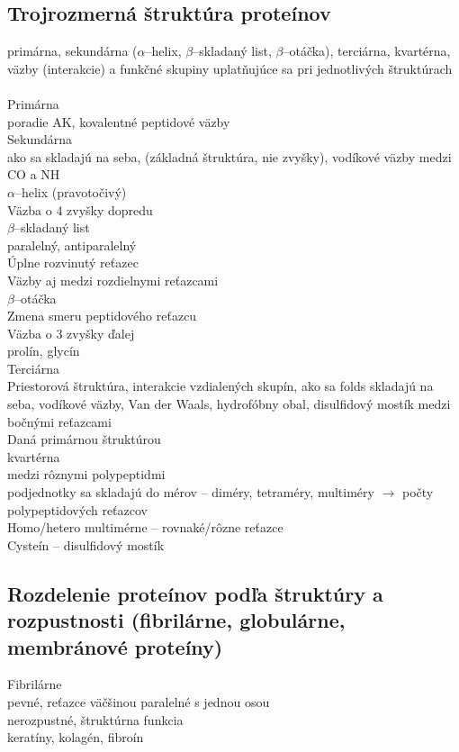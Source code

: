 \subsection{Trojrozmerná štruktúra proteínov}
primárna, sekundárna ($\alpha$--helix, $\beta$--skladaný list, $\beta$--otáčka), terciárna, kvartérna, 
väzby (interakcie) a funkčné skupiny uplatňujúce sa pri jednotlivých štruktúrach\\
\\
Primárna\\
\tab poradie AK, kovalentné peptidové väzby\\
Sekundárna\\
\tab ako sa skladajú na seba, (základná štruktúra, nie zvyšky), vodíkové väzby medzi CO a NH\\
\tab $\alpha$--helix (pravotočivý)\\
\tab \tab Väzba o 4 zvyšky dopredu\\
\tab $\beta$--skladaný list\\
\tab \tab paralelný, antiparalelný\\
\tab \tab Úplne rozvinutý reťazec\\
\tab \tab Väzby aj medzi rozdielnymi reťazcami\\
\tab $\beta$--otáčka\\
\tab \tab Zmena smeru peptidového reťazcu\\
\tab \tab Väzba o 3 zvyšky ďalej\\
\tab \tab prolín, glycín\\
Terciárna\\
\tab Priestorová štruktúra, interakcie vzdialených skupín, ako sa folds skladajú na seba, vodíkové väzby, Van der Waals, hydrofóbny obal, disulfidový mostík medzi bočnými reťazcami\\
\tab Daná primárnou štruktúrou\\
kvartérna\\
\tab medzi rôznymi polypeptidmi\\
\tab podjednotky sa skladajú do mérov -- diméry, tetraméry, multiméry $\rightarrow$ počty polypeptidových reťazcov\\
\tab Homo/hetero multimérne -- rovnaké/rôzne reťazce\\
Cysteín -- disulfidový mostík\\

\subsection{Rozdelenie proteínov podľa štruktúry a rozpustnosti (fibrilárne, globulárne, membránové proteíny)}
Fibrilárne\\
\tab pevné, reťazce väčšinou paralelné s jednou osou\\
\tab nerozpustné, štruktúrna funkcia\\
\tab keratíny, kolagén, fibroín\\

